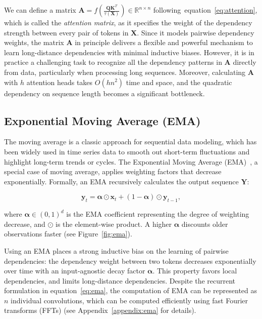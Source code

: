 We can define a matrix $\boldsymbol{A}=f(\frac{\boldsymbol{Q}{\boldsymbol{K}}^{T}}{\tau(\boldsymbol{X})})\in \mathbb{R}^{n\times n}$ following~equation~\ref{eq:attention}, which is called the \textit{attention matrix}, as it specifies the weight of the dependency strength between every pair of tokens in $\boldsymbol{X}$.
Since it models pairwise dependency weights, the matrix $\boldsymbol{A}$ in principle delivers a flexible and powerful mechanism to learn long-distance dependencies with minimal inductive biases. However, it is in practice a challenging task to recognize all the dependency patterns in $\boldsymbol{A}$ directly from data, particularly when processing long sequences. Moreover, calculating $\boldsymbol{A}$ with $h$ attention heads takes $O(hn^2)$ time and space, and the  quadratic dependency on sequence length becomes a significant bottleneck.

\subsection{Exponential Moving Average (EMA)}
\label{subsec:ema}
The moving average is a classic approach for sequential data modeling, which has been widely used in time series data to smooth out short-term fluctuations and highlight long-term trends or cycles. The Exponential Moving Average (EMA)~\citep{winters1960forecasting,hunter1986exponentially}, a special case of moving average, applies weighting factors that decrease exponentially. Formally, an EMA recursively calculates the output sequence $\boldsymbol{Y}$:

\begin{equation}
\label{eq:ema}
\mathbf{y}_t = \boldsymbol{\alpha} \odot \mathbf{x}_t + (1 - \boldsymbol{\alpha}) \odot \mathbf{y}_{t-1},
\end{equation}

where $\boldsymbol{\alpha} \in (0, 1)^{d}$ is the EMA coefficient representing the degree of weighting decrease, and $\odot$ is the element-wise product. A higher $\boldsymbol{\alpha}$ discounts older observations faster (see Figure~\ref{fig:ema}).

Using an EMA places a strong  inductive bias on the learning of pairwise dependencies: the dependency weight between two tokens decreases exponentially over time with an input-agnostic decay factor $\boldsymbol{\alpha}$.
This property favors local dependencies, and limits long-distance dependencies. Despite the recurrent formulation in equation~\ref{eq:ema}, the computation of EMA can be represented as $n$ individual convolutions, which can be computed efficiently using fast Fourier transforms (FFTs) (see Appendix~\ref{appendix:ema} for details).

